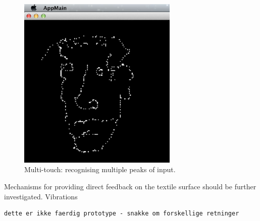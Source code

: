 \begin{figure}[h]
	\centering
  		\includegraphics[width=3in]{figures/touch/face_drawing}
	\caption[Multi-touch: recognising multiple peaks of input.]
	{Multi-touch: recognising multiple peaks of input.  }
   \label{fig:ch:textiletouch:multitouch}
\end{figure}

Mechanisms for providing direct feedback on the textile surface should be further investigated.
Vibrations \todo{\dots}


\begin{verbatim}
dette er ikke faerdig prototype - snakke om forskellige retninger
\end{verbatim}

